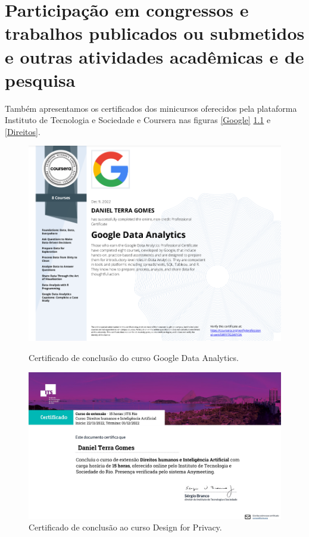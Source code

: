 \chapter{Participação em congressos e trabalhos publicados ou submetidos e outras
atividades acadêmicas e de pesquisa}

Também apresentamos os certificados dos minicursos oferecidos pela plataforma Instituto de Tecnologia e Sociedade e Coursera  nas figuras \ref{Google} \ref{Design} e \ref{Direitos}.

\begin{figure}[h!tbp]
  \centering
  \begin{minipage}[b]{0.7\textwidth}
    \includegraphics[width=\textwidth]{Figures/google.png}
    \caption{\label{Google} Certificado de conclusão do curso Google Data Analytics.}
  \end{minipage}
    \hfill
    
  \begin{minipage}[b]{0.7\textwidth}
    \includegraphics[width=\textwidth]{Figures/its1.pdf}
    \caption{\label{Design} Certificado de conclusão ao curso Design for Privacy.}
  \end{minipage}
\end{figure}
